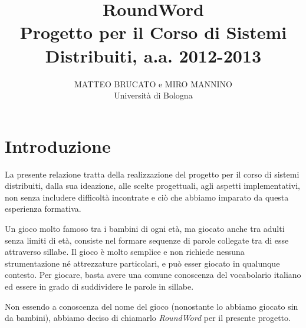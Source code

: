 \documentclass[10.5pt]{article}
\title{RoundWord\\
\large{Progetto per il Corso di Sistemi Distribuiti, a.a. 2012-2013}}
\author{MATTEO BRUCATO e MIRO MANNINO\\Università di Bologna}
\begin{document}

\maketitle

\begin{abstract}

\end{abstract}


\tableofcontents

\section{Introduzione}

La presente relazione tratta della realizzazione del progetto per il corso di sistemi distribuiti, dalla sua ideazione, alle scelte progettuali, agli aspetti implementativi, non senza includere difficoltà incontrate e ciò che abbiamo imparato da questa esperienza formativa.

Un gioco molto famoso tra i bambini di ogni età, ma giocato anche tra adulti senza limiti di età, consiste nel formare sequenze di parole collegate tra di esse attraverso sillabe. Il gioco è molto semplice e non richiede nessuna strumentazione né attrezzature particolari, e può esser giocato in qualunque contesto. Per giocare, basta avere una comune conoscenza del vocabolario italiano ed essere in grado di suddividere le parole in sillabe. 


Non essendo a conoscenza del nome del gioco (nonostante lo abbiamo giocato sin da bambini), abbiamo deciso di chiamarlo \emph{RoundWord} per il presente progetto.
\end{document}
